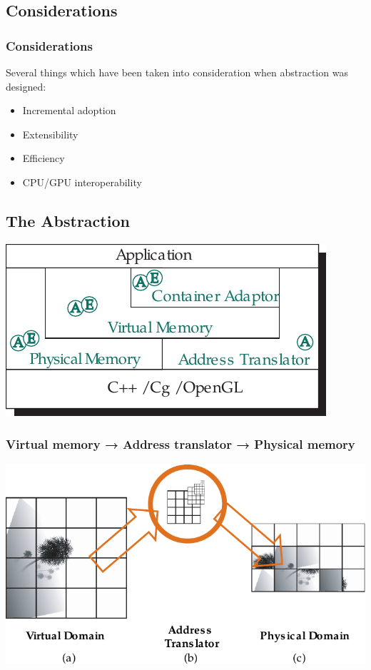 \documentclass[xcolor={usenames,dvipsnames}]{beamer}
\begin{document}
\subsection{Considerations}
\begin{frame}
  \frametitle{Considerations}

  Several things which have been taken into consideration when abstraction was
  designed:
  \begin{itemize}
  \item<2-> Incremental adoption
  \item<3-> Extensibility
  \item<4-> Efficiency
  \item<5-> CPU/GPU interoperability
  \end{itemize}
\end{frame}

\subsection{The Abstraction}
\begin{frame}
  \includegraphics[width=\linewidth]{img/glift-components}
\end{frame}

\begin{frame}
  \frametitle{Virtual memory → Address translator → Physical memory}
  \includegraphics[width=\linewidth]{img/addr-translator}
\end{frame}
\end{document}
